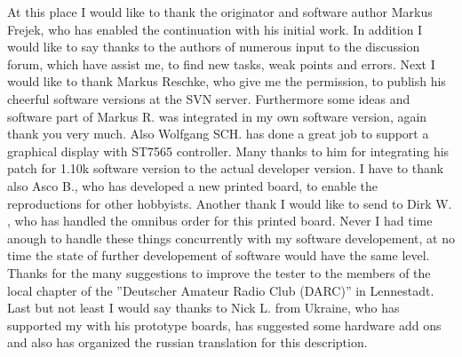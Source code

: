 At this place I would like to thank the originator and software author Markus Frejek, who has enabled the continuation
with his initial work.
In addition I would like to say thanks to the authors of numerous input to the discussion forum, which have assist me, to
find new tasks, weak points and errors.
Next I would like to thank Markus Reschke, who give me the permission, to publish his cheerful software versions at the
SVN server. Furthermore some ideas and software part of Markus R. was integrated in my own software version,
again thank you very much.
Also Wolfgang SCH. has done a great job to support a graphical display with ST7565 controller. Many thanks to him
for integrating his patch for 1.10k software version to the actual developer version.
I have to thank also Asco B., who has developed a new printed board, to enable the reproductions for other hobbyists.
Another thank I would like to send to Dirk W. , who has handled the omnibus order for this printed board.
Never I had time anough to handle these things concurrently with my software developement, at no time the state of further
developement of software would have the same level.
Thanks for the many suggestions to improve the tester to the members of the local chapter of the ''Deutscher Amateur Radio Club (DARC)''
in Lennestadt.
Last but not least I would say thanks to Nick L. from Ukraine, who has supported my with his prototype boards, 
has suggested some hardware add ons and also has organized the russian translation for this description.

